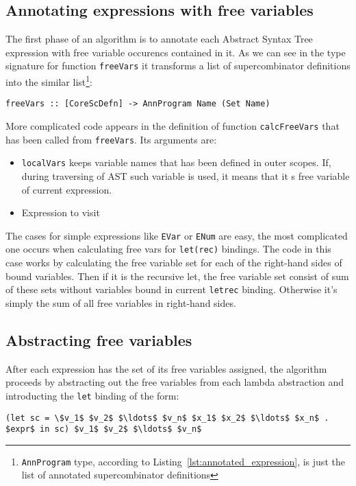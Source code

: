 \documentclass[a4paper]{report}
\begin{document}
\subsection{Annotating expressions with free variables}
The first phase of an algorithm is to annotate each Abstract Syntax Tree
expression with free variable occurencs contained in it. As we can see in the
type signature for function \texttt{freeVars} it transforms a list of
supercombinator definitions into the similar list\footnote{\texttt{AnnProgram}
type, according to Listing~\ref{lst:annotated_expression}, is just the list of
annotated supercombinator definitions}:

\begin{lstlisting}
freeVars :: [CoreScDefn] -> AnnProgram Name (Set Name)
\end{lstlisting}

More complicated code appears in the definition of function
\texttt{calcFreeVars} that has been called from \texttt{freeVars}. Its
arguments are:
\begin{itemize}
  \item \texttt{localVars} keeps variable names that has been defined in outer
    scopes. If, during traversing of AST such variable is used, it means that
    it s free variable of current expression.
  \item Expression to visit
\end{itemize}

The cases for simple expressions like \texttt{EVar} or \texttt{ENum} are easy,
the most complicated one occurs when calculating free vars for
\texttt{let(rec)} bindings. The code in this case works by calculating the free
variable set for each of the right-hand sides of bound variables. Then if it is
the recursive let, the free variable set consist of sum of these sets without
variables bound in current \texttt{letrec} binding. Otherwise it's simply the
sum of all free variables in right-hand sides.

\subsection{Abstracting free variables}
After each expression has the set of its free variables assigned, the algorithm
proceeds by abstracting out the free variables from each lambda abstraction and
introducting the \texttt{let} binding of the form:

\begin{lstlisting}[mathescape=true]
(let sc = \$v_1$ $v_2$ $\ldots$ $v_n$ $x_1$ $x_2$ $\ldots$ $x_n$ . $expr$ in sc) $v_1$ $v_2$ $\ldots$ $v_n$
\end{lstlisting}
\end{document}
